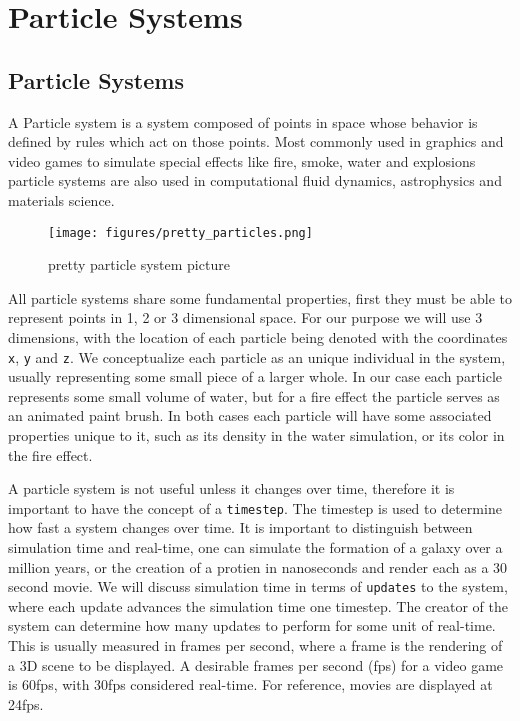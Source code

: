 \chapter{Particle Systems}

\section{Particle Systems}
A Particle system is a system composed of points in space whose behavior is
defined by rules which act on those points. Most commonly used in graphics and
video games to simulate special effects like fire, smoke, water and explosions
particle systems are also used in computational fluid dynamics, astrophysics
and materials science. 
\begin{figure}[!htc]
		\texttt{[image: figures/pretty\_particles.png]}
		\label{fig:logic}
        \caption{ pretty particle system picture }
\end{figure}



All particle systems share some fundamental properties, first they must be able
to represent points in 1, 2 or 3 dimensional space. For our purpose we will use
3 dimensions, with the location of each particle being denoted with the
coordinates \verb|x|, \verb|y| and \verb|z|. We conceptualize each particle as
an unique individual in the system, usually representing some small piece of a
larger whole. In our case each particle represents some small volume of water,
but for a fire effect the particle serves as an animated paint brush. In both
cases each particle will have some associated properties unique to it, such as
its density in the water simulation, or its color in the fire effect.


A particle system is not useful unless it changes over time, therefore it is
important to have the concept of a \verb|timestep|. The timestep is used to
determine how fast a system changes over time. It is important to distinguish
between simulation time and real-time, one can simulate the formation of a
galaxy over a million years, or the creation of a protien in nanoseconds and
render each as a 30 second movie. We will discuss simulation time in terms of
\verb|updates| to the system, where each update advances the simulation time
one timestep. The creator of the system can determine how many updates to
perform for some unit of real-time. This is usually measured in frames per
second, where a frame is the rendering of a 3D scene to be displayed. A
desirable frames per second (fps) for a video game is 60fps, with 30fps
considered real-time. For reference, movies are displayed at 24fps. 


